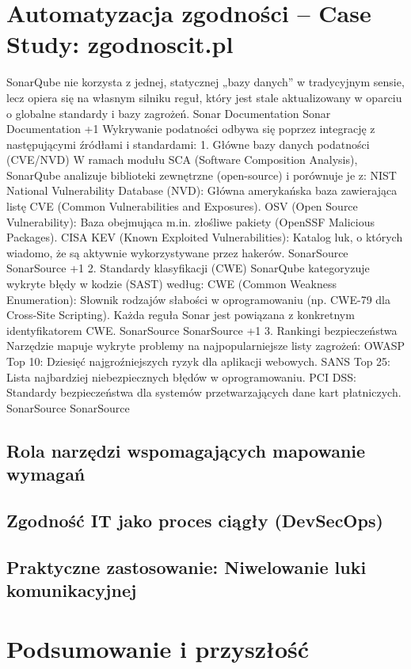 \documentclass[12pt,a4paper,oneside]{book}
\begin{document}
\chapter{Automatyzacja zgodności – Case Study: zgodnoscit.pl}
SonarQube nie korzysta z jednej, statycznej „bazy danych” w tradycyjnym sensie, lecz opiera się na własnym silniku reguł, który jest stale aktualizowany w oparciu o globalne standardy i bazy zagrożeń. 
Sonar Documentation
Sonar Documentation
 +1
Wykrywanie podatności odbywa się poprzez integrację z następującymi źródłami i standardami:
1. Główne bazy danych podatności (CVE/NVD)
W ramach modułu SCA (Software Composition Analysis), SonarQube analizuje biblioteki zewnętrzne (open-source) i porównuje je z:
NIST National Vulnerability Database (NVD): Główna amerykańska baza zawierająca listę CVE (Common Vulnerabilities and Exposures).
OSV (Open Source Vulnerability): Baza obejmująca m.in. złośliwe pakiety (OpenSSF Malicious Packages).
CISA KEV (Known Exploited Vulnerabilities): Katalog luk, o których wiadomo, że są aktywnie wykorzystywane przez hakerów. 
SonarSource
SonarSource
 +1
2. Standardy klasyfikacji (CWE)
SonarQube kategoryzuje wykryte błędy w kodzie (SAST) według:
CWE (Common Weakness Enumeration): Słownik rodzajów słabości w oprogramowaniu (np. CWE-79 dla Cross-Site Scripting). Każda reguła Sonar jest powiązana z konkretnym identyfikatorem CWE. 
SonarSource
SonarSource
 +1
3. Rankingi bezpieczeństwa
Narzędzie mapuje wykryte problemy na najpopularniejsze listy zagrożeń:
OWASP Top 10: Dziesięć najgroźniejszych ryzyk dla aplikacji webowych.
SANS Top 25: Lista najbardziej niebezpiecznych błędów w oprogramowaniu.
PCI DSS: Standardy bezpieczeństwa dla systemów przetwarzających dane kart płatniczych. 
SonarSource
SonarSource

\section{Rola narzędzi wspomagających mapowanie wymagań}
\section{Zgodność IT jako proces ciągły (DevSecOps)}
\section{Praktyczne zastosowanie: Niwelowanie luki komunikacyjnej}

\chapter{Podsumowanie i przyszłość}
\end{document}
